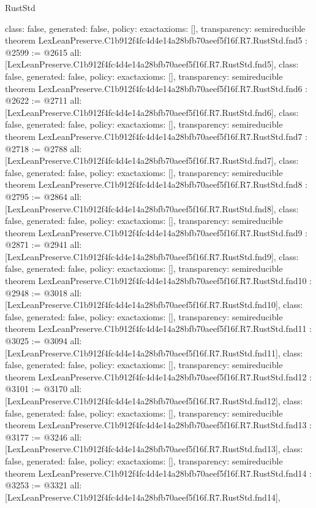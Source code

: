 \begin{lexlean}{RustStd}
\begin{coremodule}
{  class: false,
  generated: false,
  policy: exact{axioms: []},
  transparency: semireducible
}
theorem LexLeanPreserve.C1b912f4fc4d4e14a28bfb70aeef5f16f.R7.RustStd.fnd5 : @2599 := @2615 {
  all: [LexLeanPreserve.C1b912f4fc4d4e14a28bfb70aeef5f16f.R7.RustStd.fnd5],
  class: false,
  generated: false,
  policy: exact{axioms: []},
  transparency: semireducible
}
theorem LexLeanPreserve.C1b912f4fc4d4e14a28bfb70aeef5f16f.R7.RustStd.fnd6 : @2622 := @2711 {
  all: [LexLeanPreserve.C1b912f4fc4d4e14a28bfb70aeef5f16f.R7.RustStd.fnd6],
  class: false,
  generated: false,
  policy: exact{axioms: []},
  transparency: semireducible
}
theorem LexLeanPreserve.C1b912f4fc4d4e14a28bfb70aeef5f16f.R7.RustStd.fnd7 : @2718 := @2788 {
  all: [LexLeanPreserve.C1b912f4fc4d4e14a28bfb70aeef5f16f.R7.RustStd.fnd7],
  class: false,
  generated: false,
  policy: exact{axioms: []},
  transparency: semireducible
}
theorem LexLeanPreserve.C1b912f4fc4d4e14a28bfb70aeef5f16f.R7.RustStd.fnd8 : @2795 := @2864 {
  all: [LexLeanPreserve.C1b912f4fc4d4e14a28bfb70aeef5f16f.R7.RustStd.fnd8],
  class: false,
  generated: false,
  policy: exact{axioms: []},
  transparency: semireducible
}
theorem LexLeanPreserve.C1b912f4fc4d4e14a28bfb70aeef5f16f.R7.RustStd.fnd9 : @2871 := @2941 {
  all: [LexLeanPreserve.C1b912f4fc4d4e14a28bfb70aeef5f16f.R7.RustStd.fnd9],
  class: false,
  generated: false,
  policy: exact{axioms: []},
  transparency: semireducible
}
theorem LexLeanPreserve.C1b912f4fc4d4e14a28bfb70aeef5f16f.R7.RustStd.fnd10 : @2948 := @3018 {
  all: [LexLeanPreserve.C1b912f4fc4d4e14a28bfb70aeef5f16f.R7.RustStd.fnd10],
  class: false,
  generated: false,
  policy: exact{axioms: []},
  transparency: semireducible
}
theorem LexLeanPreserve.C1b912f4fc4d4e14a28bfb70aeef5f16f.R7.RustStd.fnd11 : @3025 := @3094 {
  all: [LexLeanPreserve.C1b912f4fc4d4e14a28bfb70aeef5f16f.R7.RustStd.fnd11],
  class: false,
  generated: false,
  policy: exact{axioms: []},
  transparency: semireducible
}
theorem LexLeanPreserve.C1b912f4fc4d4e14a28bfb70aeef5f16f.R7.RustStd.fnd12 : @3101 := @3170 {
  all: [LexLeanPreserve.C1b912f4fc4d4e14a28bfb70aeef5f16f.R7.RustStd.fnd12],
  class: false,
  generated: false,
  policy: exact{axioms: []},
  transparency: semireducible
}
theorem LexLeanPreserve.C1b912f4fc4d4e14a28bfb70aeef5f16f.R7.RustStd.fnd13 : @3177 := @3246 {
  all: [LexLeanPreserve.C1b912f4fc4d4e14a28bfb70aeef5f16f.R7.RustStd.fnd13],
  class: false,
  generated: false,
  policy: exact{axioms: []},
  transparency: semireducible
}
theorem LexLeanPreserve.C1b912f4fc4d4e14a28bfb70aeef5f16f.R7.RustStd.fnd14 : @3253 := @3321 {
  all: [LexLeanPreserve.C1b912f4fc4d4e14a28bfb70aeef5f16f.R7.RustStd.fnd14],
}
\end{coremodule}
\end{lexlean}
